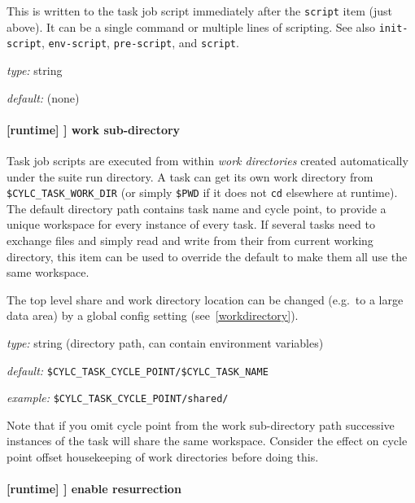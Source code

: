 This is written to the task job script immediately after the \lstinline=script=
item (just above).  It can be a single command or multiple lines of scripting.  See also
\lstinline=init-script=, \lstinline=env-script=, \lstinline=pre-script=, and
\lstinline=script=.

\begin{myitemize}
\item {\em type:} string
\item {\em default:} (none)
\end{myitemize}

\paragraph[work sub-directory]{[runtime] \textrightarrow [[\_\_NAME\_\_]] \textrightarrow work sub-directory}
\label{worksubdirectory}

Task job scripts are executed from within {\em work directories} created
automatically under the suite run directory. A task can get its own work
directory from \lstinline=$CYLC_TASK_WORK_DIR= (or simply \lstinline=$PWD= if
it does not \lstinline=cd= elsewhere at runtime). The default directory
path contains task name and cycle point, to provide a unique workspace for
every instance of every task. If several tasks need to exchange files and
simply read and write from their from current working directory, this item
can be used to override the default to make them all use the same workspace.

The top level share and work directory location can be changed (e.g.\ to a
large data area) by a global config setting (see~\ref{workdirectory}). 

\begin{myitemize}
\item {\em type:} string (directory path, can contain environment variables)
\item {\em default:} \lstinline=$CYLC_TASK_CYCLE_POINT/$CYLC_TASK_NAME=
\item {\em example:} \lstinline=$CYLC_TASK_CYCLE_POINT/shared/=
\end{myitemize}

Note that if you omit cycle point from the work sub-directory path successive
instances of the task will share the same workspace.  Consider the effect on
cycle point offset housekeeping of work directories before doing this.

\paragraph[enable resurrection]{ [runtime] \textrightarrow [[\_\_NAME\_\_]] \textrightarrow enable resurrection}

